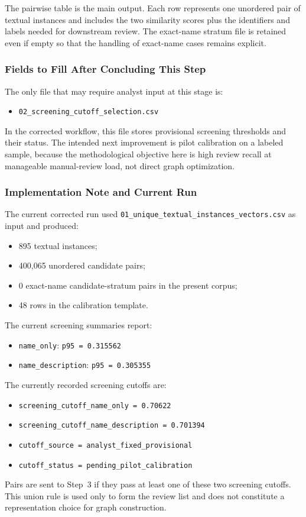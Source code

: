 The pairwise table is the main output. Each row represents one unordered pair of textual instances and includes the two similarity scores plus the identifiers and labels needed for downstream review. The exact-name stratum file is retained even if empty so that the handling of exact-name cases remains explicit.

\subsubsection{Fields to Fill After Concluding This Step}
\label{sec:step2_fields_to_fill}

The only file that may require analyst input at this stage is:
\begin{itemize}
    \item \texttt{02\_screening\_cutoff\_selection.csv}
\end{itemize}

In the corrected workflow, this file stores provisional screening thresholds and their status. The intended next improvement is pilot calibration on a labeled sample, because the methodological objective here is high review recall at manageable manual-review load, not direct graph optimization.

\subsubsection{Implementation Note and Current Run}
\label{sec:step2_implementation_note}

The current corrected run used \texttt{01\_unique\_textual\_instances\_vectors.csv} as input and produced:
\begin{itemize}
    \item 895 textual instances;
    \item 400,065 unordered candidate pairs;
    \item 0 exact-name candidate-stratum pairs in the present corpus;
    \item 48 rows in the calibration template.
\end{itemize}

The current screening summaries report:
\begin{itemize}
    \item \texttt{name\_only}: \texttt{p95 = 0.315562}
    \item \texttt{name\_description}: \texttt{p95 = 0.305355}
\end{itemize}

The currently recorded screening cutoffs are:
\begin{itemize}
    \item \texttt{screening\_cutoff\_name\_only = 0.70622}
    \item \texttt{screening\_cutoff\_name\_description = 0.701394}
    \item \texttt{cutoff\_source = analyst\_fixed\_provisional}
    \item \texttt{cutoff\_status = pending\_pilot\_calibration}
\end{itemize}

Pairs are sent to Step~3 if they pass at least one of these two screening cutoffs. This union rule is used only to form the review list and does not constitute a representation choice for graph construction.
